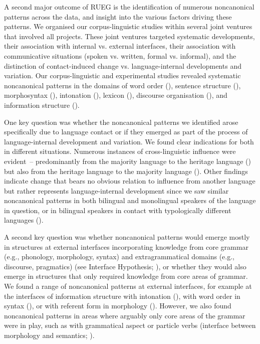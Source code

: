 \documentclass[output=paper,colorlinks,citecolor=brown]{langscibook}
\begin{document}
A second major outcome of RUEG is the identification of numerous noncanonical patterns across the data, and insight into the various factors driving these patterns. We organised our corpus-linguistic studies within several joint ventures that involved all projects. These joint ventures targeted systematic developments, their association with internal vs. external interfaces, their association with communicative situations (spoken vs. written, formal vs. informal), and the distinction of contact-induced change vs. language-internal developments and variation. Our corpus\hyp linguistic and experimental studies revealed systematic noncanonical patterns in the domains of word order (\cite{chapters/11, chapters/13}), sentence structure (\cite{chapters/05, chapters/08, chapters/09, chapters/11, chapters/13}), morphosyntax (\cite{chapters/06, chapters/07}), intonation (\cite{chapters/12}), lexicon (\cite{chapters/10}), discourse organisation (\cite{chapters/14, chapters/15}), and information structure (\cite{chapters/11, chapters/12, chapters/13}).

\begin{sloppypar}
One key question was whether the noncanonical patterns we identified arose specifically due to language contact or if they emerged as part of the process of language\hyp internal development and variation. We found clear indications for both in different situations. Numerous instances of cross\hyp linguistic influence were evident~-- predominantly from the majority language to the heritage language (\cite{chapters/05, chapters/07, chapters/10, chapters/14}) but also from the heritage language to the majority language (\cite{chapters/13}). Other findings indicate change that bears no obvious relation to influence from another language but rather represents language\hyp internal development since we saw similar noncanonical patterns in both bilingual and monolingual speakers of the language in question, or in bilingual speakers in contact with typologically different languages (\cite{chapters/06, chapters/09, chapters/14}).
\end{sloppypar}

A second key question was whether noncanonical patterns would emerge mostly in structures at external interfaces incorporating knowledge from core grammar (e.g., phonology, morphology, syntax) and extragrammatical domains (e.g., discourse, pragmatics) (see Interface Hypothesis; \citealt{Sorace2011}), or whether they would also emerge in structures that only required knowledge from core areas of grammar. We found a range of noncanonical patterns at external interfaces, for example at the interfaces of information structure with intonation (\cite{chapters/12}), with word order in syntax (\cite{chapters/05, chapters/11, chapters/13}), or with referent form in morphology (\cite{chapters/06, chapters/13}). However, we also found noncanonical patterns in areas where arguably only core areas of the grammar were in play, such as with grammatical aspect or particle verbs (interface between morphology and semantics; \cite{chapters/07, chapters/10}).
\end{document}
